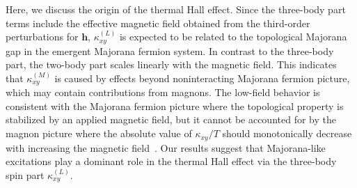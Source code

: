 \documentclass[twocolumn,superscriptaddress,showpacs, longbibliography, aps, prb]{revtex4-2}
\newcommand{\red}[1]{\textcolor{red}{#1}}
\newcommand{\blue}[1]{\textcolor{blue}{#1}}
\newcommand{\orange}[1]{\textcolor{orange}{#1}}
\begin{document}
 Here, we discuss the origin of the thermal Hall effect.
Since the three-body part terms include the effective magnetic field obtained from the third-order perturbations for $\bm{h}$,
 $\kappa_{xy}^{(L)}$ is expected to be related to the topological Majorana gap in the emergent Majorana fermion system.
 In contrast to the three-body part, the two-body part 
scales linearly with the magnetic field. 
This indicates that $\kappa_{xy}^{(M)}$ is caused by effects beyond noninteracting Majorana fermion picture, which
may contain contributions from %
magnons.
The low-field behavior is consistent with the Majorana fermion picture where the topological property %
is stabilized by an applied magnetic field, but it cannot be accounted for by the magnon picture where the absolute value of $\kappa_{xy}/T$ should monotonically decrease %
with increasing the magnetic field~\cite{McClarty_PRB2018}.
Our results suggest that Majorana-like excitations %
play a dominant role in the thermal Hall effect via the three-body spin part $\kappa_{xy}^{(L)}$.

\end{document}
